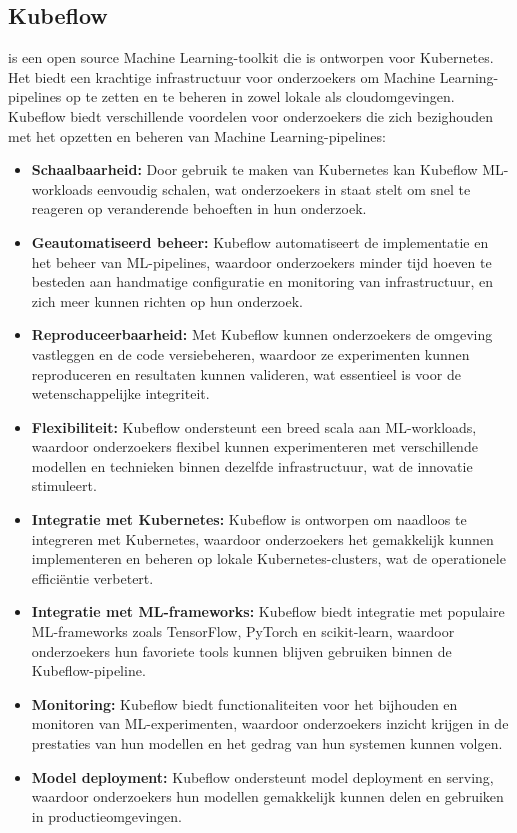 \subsection{Kubeflow}
\autocite{Kubeflow2021} is een open source Machine Learning-toolkit die is ontworpen voor Kubernetes. Het biedt een krachtige infrastructuur voor onderzoekers om Machine Learning-pipelines op te zetten en te beheren in zowel lokale als cloudomgevingen.
Kubeflow biedt verschillende voordelen voor onderzoekers die zich bezighouden met het opzetten en beheren van Machine Learning-pipelines:
\begin{itemize}
    \item \textbf{Schaalbaarheid:} Door gebruik te maken van Kubernetes kan Kubeflow ML-workloads eenvoudig schalen, wat onderzoekers in staat stelt om snel te reageren op veranderende behoeften in hun onderzoek.
    \item \textbf{Geautomatiseerd beheer:} Kubeflow automatiseert de implementatie en het beheer van ML-pipelines, waardoor onderzoekers minder tijd hoeven te besteden aan handmatige configuratie en monitoring van infrastructuur, en zich meer kunnen richten op hun onderzoek.
    \item \textbf{Reproduceerbaarheid:} Met Kubeflow kunnen onderzoekers de omgeving vastleggen en de code versiebeheren, waardoor ze experimenten kunnen reproduceren en resultaten kunnen valideren, wat essentieel is voor de wetenschappelijke integriteit.
    \item \textbf{Flexibiliteit:} Kubeflow ondersteunt een breed scala aan ML-workloads, waardoor onderzoekers flexibel kunnen experimenteren met verschillende modellen en technieken binnen dezelfde infrastructuur, wat de innovatie stimuleert.
    \item \textbf{Integratie met Kubernetes:} Kubeflow is ontworpen om naadloos te integreren met Kubernetes, waardoor onderzoekers het gemakkelijk kunnen implementeren en beheren op lokale Kubernetes-clusters, wat de operationele efficiëntie verbetert.
    \item \textbf{Integratie met ML-frameworks:} Kubeflow biedt integratie met populaire ML-frameworks zoals TensorFlow, PyTorch en scikit-learn, waardoor onderzoekers hun favoriete tools kunnen blijven gebruiken binnen de Kubeflow-pipeline.
    \item \textbf{Monitoring:} Kubeflow biedt functionaliteiten voor het bijhouden en monitoren van ML-experimenten, waardoor onderzoekers inzicht krijgen in de prestaties van hun modellen en het gedrag van hun systemen kunnen volgen.
    \item \textbf{Model deployment:} Kubeflow ondersteunt model deployment en serving, waardoor onderzoekers hun modellen gemakkelijk kunnen delen en gebruiken in productieomgevingen.
\end{itemize}
